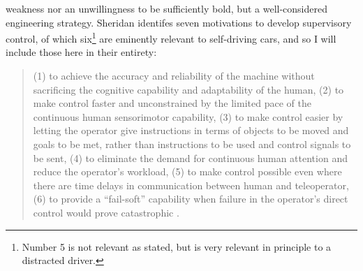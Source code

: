 weakness nor an unwillingness to be sufficiently bold, but a
well-considered engineering strategy. Sheridan identifes seven
motivations to develop supervisory control, of which
six\footnote{Number 5 is not relevant as stated, but is very relevant
  in principle to a distracted driver.} are
eminently relevant to self-driving cars, and so I will include those
here in their entirety:
\begin{quote} (1) to achieve the accuracy and reliability of the
  machine without sacrificing the cognitive capability and
  adaptability of the human,
(2) to make control faster and unconstrained by the limited pace of
  the continuous human sensorimotor capability,
(3) to make control easier by letting the operator give instructions
  in terms of objects to be moved and goals to be met, rather than
  instructions to be used and control signals to be sent,
(4) to eliminate the demand for continuous human attention and reduce
  the operator's workload,
(5) to make control possible even where there are time delays in
  communication between human and teleoperator,
(6) to provide a ``fail-soft'' capability when failure in the
  operator's direct control would prove catastrophic \cite[p. 12]{sheridan}.
\end{quote}

